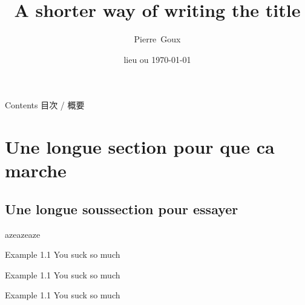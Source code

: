\documentclass[aspectratio=169,12pt]{beamer}
\title{A shorter way of writing the title}
\author
{Pierre~Goux}
\date{lieu ou \today}
\begin{document}



\begin{frame}{Contents 目次 / 概要}
\vspace*{1em}
\begin{minipage}{.1\linewidth}\hfill\vfill\end{minipage}\begin{minipage}{.8\linewidth}\tableofcontents[pausesections]\end{minipage}
\end{frame}

\section{Une longue section pour que ca marche}
\subsection{Une longue soussection pour essayer}
\begingroup
\small
\begin{frame}[t]{azeazeaze}
\vspace{1em}
\begin{block}{Example 1.1}
You suck so much
\hyperlink{targetname}{}
\end{block}
\hyperlink{targetname}{}
\begin{exampleblock}{Example 1.1}
You suck so much
\end{exampleblock}
\begin{alertblock}{Example 1.1}
You suck so much
\end{alertblock}
\end{frame}
\end{document}
